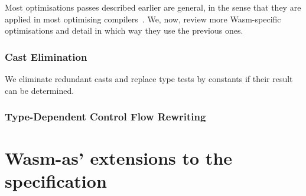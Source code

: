 \documentclass[10pt]{article}
\begin{document}
Most optimisations passes described earlier are general, in the sense that they
are applied in most optimising compilers~\cite{muchnick1997advanced}. We, now,
review more Wasm-specific optimisations and detail in which way they use the
previous ones.
\subsubsection{Cast Elimination}
We eliminate redundant casts and replace type tests by constants if their result
can be determined.

\subsubsection{Type-Dependent Control Flow Rewriting}\label{broncast}
\printbibliography
\newpage
\appendix
\section{Wasm-as' extensions to the specification}\label{wasmasex}
\end{document}
